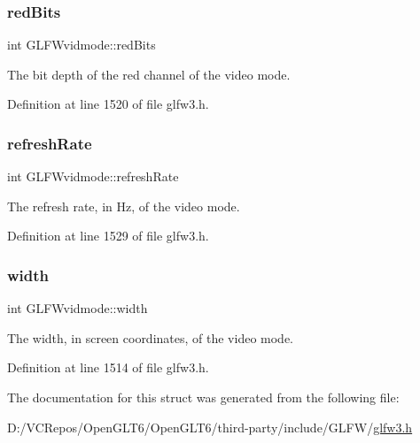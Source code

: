 \subsubsection{\texorpdfstring{redBits}{redBits}}
{\footnotesize\ttfamily int G\+L\+F\+Wvidmode\+::red\+Bits}

The bit depth of the red channel of the video mode. 

Definition at line 1520 of file glfw3.\+h.

\mbox{\label{struct_g_l_f_wvidmode_a791bdd6c7697b09f7e9c97054bf05649}} 
\subsubsection{\texorpdfstring{refreshRate}{refreshRate}}
{\footnotesize\ttfamily int G\+L\+F\+Wvidmode\+::refresh\+Rate}

The refresh rate, in Hz, of the video mode. 

Definition at line 1529 of file glfw3.\+h.

\mbox{\label{struct_g_l_f_wvidmode_a698dcb200562051a7249cb6ae154c71d}} 
\subsubsection{\texorpdfstring{width}{width}}
{\footnotesize\ttfamily int G\+L\+F\+Wvidmode\+::width}

The width, in screen coordinates, of the video mode. 

Definition at line 1514 of file glfw3.\+h.



The documentation for this struct was generated from the following file\+:\begin{DoxyCompactItemize}
\item 
D\+:/\+V\+C\+Repos/\+Open\+G\+L\+T6/\+Open\+G\+L\+T6/third-\/party/include/\+G\+L\+F\+W/\mbox{\hyperlink{glfw3_8h}{glfw3.\+h}}\end{DoxyCompactItemize}
